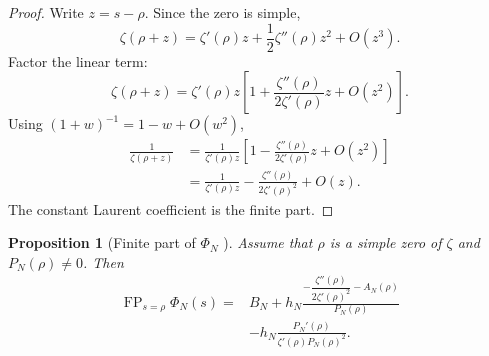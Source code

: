 \documentclass[11pt]{amsart}
\numberwithin{equation}{section}
\theoremstyle{plain}
\newtheorem{proposition}[theorem]{Proposition}
\theoremstyle{definition}
\theoremstyle{remark}
\DeclareMathOperator{\FP}{FP}
\newcommand{\1}{\mathbf{1}}
\begin{document}
\begin{proof}
Write \(z=s-\rho\).  Since the zero is simple,
\begin{equation}
\zeta(\rho+z)
=
\zeta'(\rho)z
+
\frac12\zeta''(\rho)z^2
+
O(z^3).
\label{eq:inverse_zeta_taylor_detailed}
\end{equation}
Factor the linear term:
\begin{equation}
\zeta(\rho+z)
=
\zeta'(\rho)z
\left[
1+
\frac{\zeta''(\rho)}{2\zeta'(\rho)}z
+O(z^2)
\right].
\label{eq:inverse_zeta_factor_detailed}
\end{equation}
Using \((1+w)^{-1}=1-w+O(w^2)\),
\begin{align}
\frac1{\zeta(\rho+z)}
&=
\frac1{\zeta'(\rho)z}
\left[
1-
\frac{\zeta''(\rho)}{2\zeta'(\rho)}z
+O(z^2)
\right]
\label{eq:inverse_zeta_invert_detailed}
\\
&=
\frac1{\zeta'(\rho)z}
-
\frac{\zeta''(\rho)}{2\zeta'(\rho)^2}
+O(z).
\label{eq:inverse_zeta_laurent_detailed}
\end{align}
The constant Laurent coefficient is the finite part.
\end{proof}


\begin{proposition}[Finite part of \(\Phi_N\) {}]
\label{prop:finite_part_Phi}
Assume that \(\rho\) is a simple zero of \(\zeta\) and
\(P_N(\rho)\neq0\).  Then
\begin{align}
\FP_{s=\rho}\Phi_N(s)
={}&
B_N
+
h_N
\frac{
-\dfrac{\zeta''(\rho)}{2\zeta'(\rho)^2}
-A_N(\rho)
}{
P_N(\rho)
}
\label{eq:Phi_finite_part_first}
\\
&-
h_N
\frac{P_N'(\rho)}
{\zeta'(\rho)P_N(\rho)^2}.
\label{eq:Phi_finite_part_second}
\end{align}
\end{proposition}
\end{document}
